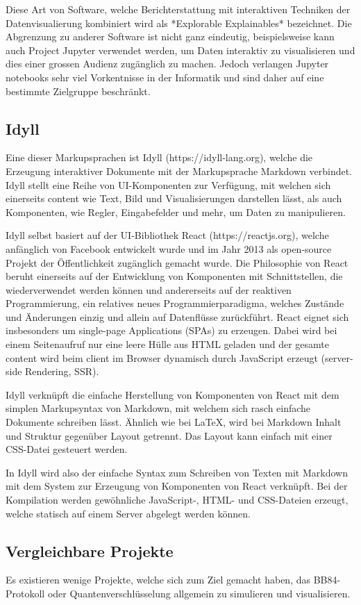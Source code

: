 \documentclass[a4paper,10.2pt,pdftex]{scrartcl}%
\begin{document}
Diese Art von Software, welche Berichterstattung mit interaktiven Techniken der Datenvisualierung kombiniert wird als *Explorable Explainables* bezeichnet. Die Abgrenzung zu anderer Software ist nicht ganz eindeutig, beispielsweise kann auch Project Jupyter verwendet werden, um Daten interaktiv zu visualisieren und dies einer grossen Audienz zugänglich zu machen. Jedoch verlangen Jupyter notebooks sehr viel Vorkentnisse in der Informatik und sind daher auf eine bestimmte Zielgruppe beschränkt. 
\subsection{Idyll}
Eine dieser Markupsprachen ist Idyll (https://idyll-lang.org), welche die Erzeugung interaktiver Dokumente mit der Markupsprache Markdown verbindet. Idyll stellt eine Reihe von UI-Komponenten zur Verfügung, mit welchen sich einerseits content wie Text, Bild und Visualisierungen darstellen lässt, als auch Komponenten, wie Regler, Eingabefelder und mehr, um Daten zu manipulieren.

Idyll selbst basiert auf der UI-Bibliothek React (https://reactjs.org), welche anfänglich von Facebook entwickelt wurde und im Jahr 2013 als open-source Projekt der Öffentlichkeit zugänglich gemacht wurde. Die Philosophie von React beruht einerseits auf der Entwicklung von Komponenten mit Schnittstellen, die wiederverwendet werden können und andererseits auf der reaktiven Programmierung, ein relatives neues Programmierparadigma, welches Zustände und Änderungen einzig und allein auf Datenflüsse zurückführt. React eignet sich insbesonders um single-page Applications (SPAs) zu erzeugen. Dabei wird bei einem Seitenaufruf nur eine leere Hülle aus HTML geladen und der gesamte content wird beim client im Browser dynamisch durch JavaScript erzeugt (server-side Rendering, SSR).

Idyll verknüpft die einfache Herstellung von Komponenten von React mit dem simplen Markupsyntax von Markdown, mit welchem sich rasch einfache Dokumente schreiben lässt. Ähnlich wie bei LaTeX, wird bei Markdown Inhalt und Struktur gegenüber Layout getrennt. Das Layout kann einfach mit einer CSS-Datei gesteuert werden.

In Idyll wird also der einfache Syntax zum Schreiben von Texten mit Markdown mit dem System zur Erzeugung von Komponenten von React verknüpft. Bei der Kompilation werden gewöhnliche JavaScript-, HTML- und CSS-Dateien erzeugt, welche statisch auf einem Server abgelegt werden können.
\subsection{Vergleichbare Projekte}
Es existieren wenige Projekte, welche sich zum Ziel gemacht haben, das BB84-Protokoll oder Quantenverschlüsselung allgemein zu simulieren und visualisieren.
\end{document}
